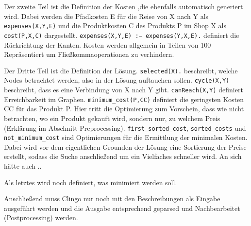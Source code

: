 Der zweite Teil ist die Definition der Kosten ,die ebenfalls automatisch generiert wird. Dabei werden die Pfadkosten E für die Reise von X nach Y als \texttt{expenses(X,Y,E)} und die Produktkosten C des Produkts P im Shop X als \texttt{cost(P,X,C)} dargestellt. \texttt{expenses(X,Y,E) :− expenses(Y,X,E).} definiert die Rückrichtung der Kanten. Kosten werden allgemein in Teilen von 100 Repräsentiert um Fließkommaoperationen zu verhindern. 



Der Dritte Teil ist die Definition der Lösung. \texttt{selected(X).} beschreibt, welche Nodes betrachtet werden, also in der Lösung auftauchen sollen. \texttt{cycle(X,Y)} beschreibt, dass es eine Verbindung von X nach Y gibt. \texttt{canReach(X,Y)} definiert Erreichbarkeit im Graphen. \texttt{minimum\_cost(P,CC)} definiert die geringsten Kosten CC für das Produkt P. Hier tritt die Optimierung zum Vorschein, dass wie nicht betrachten, wo ein Produkt gekauft wird, sondern nur, zu welchem Preis (Erklärung im Abschnitt Preprocessing). \texttt{first\_sorted\_cost}, \texttt{sorted\_costs} und \texttt{not\_minimum\_cost} sind Optimierungen für die Ermittlung der minimalen Kosten. Dabei wird vor dem eigentlichen Grounden der Lösung eine Sortierung der Preise erstellt, sodass die Suche anschließend um ein Vielfaches schneller wird. An sich hätte auch ..



Als letztes wird noch definiert, was minimiert werden soll.



Anschließend muss Clingo nur noch mit den Beschreibungen als Eingabe ausgeführt werden und die Ausgabe entsprechend geparsed und Nachbearbeitet (Postprocessing) werden.
